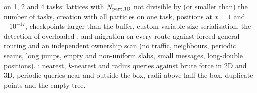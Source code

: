 \begin{validation}
 on 1, 2 and 4 tasks: lattices with $N_{\rm part,1D}$ not divisible by (or smaller than) the number of
tasks, creation with all particles on one task, positions at $x=1$ and $-10^{-17}$, checkpoints larger than the buffer, custom
variable-size serialisation, the detection of overloaded , and migration on every route against forced general routing
and an independent ownership scan (no traffic, neighbours, periodic seams, long jumps, empty and non-uniform slabs, small messages,
long-double positions). : nearest, $k$-nearest and radius queries against brute force in 2D and 3D,
periodic queries near and outside the box, radii above half the box, duplicate points and the empty tree.
\end{validation}
